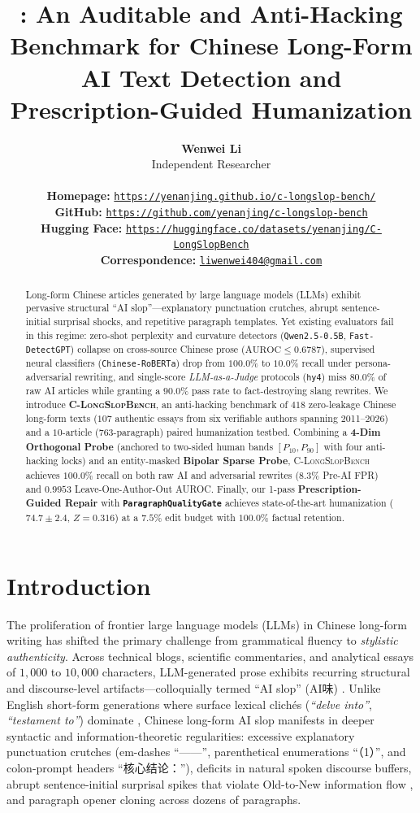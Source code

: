 \documentclass[11pt]{article}
\title{\bench{}: An Auditable and Anti-Hacking Benchmark for Chinese Long-Form AI Text Detection and Prescription-Guided Humanization}
\author{
  \textbf{Wenwei Li} \\
  Independent Researcher \\[6pt]
  {\small
  \begin{tabular}{@{}l@{}}
  \textbf{Homepage:} \href{https://yenanjing.github.io/c-longslop-bench/}{\color{blue}\texttt{https://yenanjing.github.io/c-longslop-bench/}} \\[1.5pt]
  \textbf{GitHub:} \href{https://github.com/yenanjing/c-longslop-bench}{\color{blue}\texttt{https://github.com/yenanjing/c-longslop-bench}} \\[1.5pt]
  \textbf{Hugging Face:} \href{https://huggingface.co/datasets/yenanjing/C-LongSlopBench}{\color{blue}\texttt{https://huggingface.co/datasets/yenanjing/C-LongSlopBench}} \\[1.5pt]
  \textbf{Correspondence:} \href{mailto:liwenwei404@gmail.com}{\color{blue}\texttt{liwenwei404@gmail.com}}
  \end{tabular}}
}
\newcommand{\zh}[1]{#1}
\newcommand{\bench}{\textsc{C-LongSlopBench}}
\newcommand{\gate}{\texttt{ParagraphQualityGate}}
\begin{document}
\maketitle

\begin{abstract}
Long-form Chinese articles generated by large language models (LLMs) exhibit pervasive structural ``AI slop''---explanatory punctuation crutches, abrupt sentence-initial surprisal shocks, and repetitive paragraph templates. Yet existing evaluators fail in this regime: zero-shot perplexity and curvature detectors (\texttt{Qwen2.5-0.5B}, \texttt{Fast-DetectGPT}) collapse on cross-source Chinese prose ($\text{AUROC} \le 0.6787$), supervised neural classifiers (\texttt{Chinese-RoBERTa}) drop from $100.0\%$ to $10.0\%$ recall under persona-adversarial rewriting, and single-score \textit{LLM-as-a-Judge} protocols (\texttt{hy4}) miss $80.0\%$ of raw AI articles while granting a $90.0\%$ pass rate to fact-destroying slang rewrites. We introduce \textbf{\bench{}}, an anti-hacking benchmark of $418$ zero-leakage Chinese long-form texts ($107$ authentic essays from six verifiable authors spanning 2011--2026) and a $10$-article ($763$-paragraph) paired humanization testbed. Combining a \textbf{4-Dim Orthogonal Probe} (anchored to two-sided human bands $[P_{10}, P_{90}]$ with four anti-hacking locks) and an entity-masked \textbf{Bipolar Sparse Probe}, \bench{} achieves $100.0\%$ recall on both raw AI and adversarial rewrites ($8.3\%$ Pre-AI FPR) and $0.9953$ Leave-One-Author-Out AUROC. Finally, our 1-pass \textbf{Prescription-Guided Repair} with \textbf{\gate{}} achieves state-of-the-art humanization ($74.7 \pm 2.4$, $Z=0.316$) at a $7.5\%$ edit budget with $100.0\%$ factual retention.
\end{abstract}

\section{Introduction}

The proliferation of frontier large language models (LLMs) in Chinese long-form writing has shifted the primary challenge from grammatical fluency to \textit{stylistic authenticity}. Across technical blogs, scientific commentaries, and analytical essays of $1,000$ to $10,000$ characters, LLM-generated prose exhibits recurring structural and discourse-level artifacts---colloquially termed ``AI slop'' (\zh{AI味}) \cite{slopbench2026,detectorscope2026}. Unlike English short-form generations where surface lexical clichés (\textit{``delve into''}, \textit{``testament to''}) dominate \cite{shaib2024syntactic}, Chinese long-form AI slop manifests in deeper syntactic and information-theoretic regularities: excessive explanatory punctuation crutches (em-dashes ``\zh{——}'', parenthetical enumerations ``\zh{（1）}'', and colon-prompt headers ``\zh{核心结论：}''), deficits in natural spoken discourse buffers, abrupt sentence-initial surprisal spikes that violate Old-to-New information flow \cite{levy2007speakers,nyusurprisal2026}, and paragraph opener cloning across dozens of paragraphs.
\end{document}
